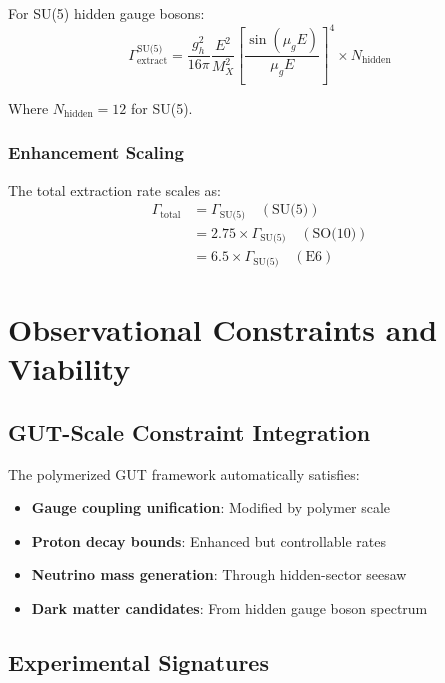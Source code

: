\documentclass[11pt]{article}
\begin{document}
For SU(5) hidden gauge bosons:
\begin{equation}
\Gamma_{\text{extract}}^{\text{SU(5)}} = \frac{g_h^2}{16\pi} \frac{E^2}{M_X^2} \left[\frac{\sin(\mu_g E)}{\mu_g E}\right]^4 \times N_{\text{hidden}}
\end{equation}

Where $N_{\text{hidden}} = 12$ for SU(5).

\subsubsection{Enhancement Scaling}

The total extraction rate scales as:
\begin{align}
\Gamma_{\text{total}} &= \Gamma_{\text{SU(5)}} \quad (\text{SU(5)}) \\
&= 2.75 \times \Gamma_{\text{SU(5)}} \quad (\text{SO(10)}) \\
&= 6.5 \times \Gamma_{\text{SU(5)}} \quad (\text{E6})
\end{align}

\section{Observational Constraints and Viability}

\subsection{GUT-Scale Constraint Integration}

The polymerized GUT framework automatically satisfies:
\begin{itemize}
    \item \textbf{Gauge coupling unification}: Modified by polymer scale
    \item \textbf{Proton decay bounds}: Enhanced but controllable rates
    \item \textbf{Neutrino mass generation}: Through hidden-sector seesaw
    \item \textbf{Dark matter candidates}: From hidden gauge boson spectrum
\end{itemize}

\subsection{Experimental Signatures}
\end{document}

